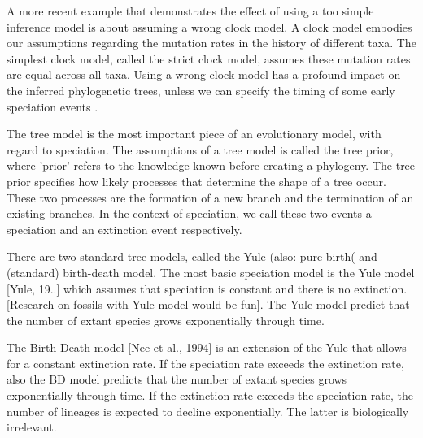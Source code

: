 %
%

A more recent example that demonstrates the effect of using a too simple 
inference model is about assuming a wrong clock model. 
A clock model embodies our assumptions regarding the mutation rates in
the history of different taxa. The simplest clock model, called the strict
clock model, assumes these mutation rates are equal across all taxa.
Using a wrong clock model has a profound impact 
on the inferred phylogenetic trees, unless we can
specify the timing of some early speciation events \cite{duchene2014impact}.

%
%


The tree model is the most important piece of an evolutionary model,
with regard to speciation. The assumptions of a tree model is 
called the tree prior, where 'prior' refers to the knowledge
known before creating a phylogeny. The tree prior specifies how likely
processes that determine the shape of a tree occur. These
two processes are the formation of a new branch and the termination of
an existing branches. In the context of speciation, we call these
two events a speciation and an extinction event respectively.

There are two standard tree models, called the Yule (also: pure-birth(
and (standard) birth-death model. The most basic speciation model
is the Yule model [Yule, 19..] which assumes that speciation
is constant and there is no extinction.
[Research on fossils with Yule model would be fun].
The Yule model predict that the number of extant species
grows exponentially through time.

%

The Birth-Death model [Nee et al., 1994] is an extension of the
Yule that allows for a constant extinction rate. 
If the speciation rate exceeds the extinction rate,
also the BD model predicts that the number of extant species
grows exponentially through time. If the extinction rate exceeds
the speciation rate, the number of lineages is expected to decline
exponentially. The latter is biologically irrelevant.

%

